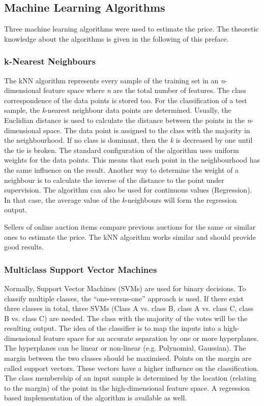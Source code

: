 \subsection{Machine Learning Algorithms}
Three machine learning algorithms were used to estimate the price. The theoretic knowledge about the algorithms is given in the following of this preface.
\subsubsection{k-Nearest Neighbours}
The kNN algorithm \cite{knn} represents every sample of the training set in an \textit{n}-dimensional feature space where \textit{n} are the total number of features. The class correspondence of the data points is stored too. For the classification of a test sample, the \textit{k}-nearest neighbour data points are determined. Usually, the Euclidian distance is used to calculate the distance between the points in the \textit{n}-dimensional space. The data point is assigned to the class with the majority in the neighbourhood. If no class is dominant, then the \textit{k} is decreased by one until the tie is broken. The standard configuration of the algorithm uses uniform weights for the data points. This means that each point in the neighbourhood has the same influence on the result. Another way to determine the weight of a neighbour is to calculate the inverse of the distance to the point under supervision. The algorithm can also be used for continuous values (Regression). In that case, the average value of the \textit{k}-neighbours will form the regression output.

Sellers of online auction items compare previous auctions for the same or similar ones to estimate the price. The kNN algorithm works similar and should provide good results. 
\subsubsection{Multiclass Support Vector Machines}
Normally, Support Vector Machines (SVMs)\cite{svc} are used for binary decisions. To classify multiple classes, the ``one-versus-one'' approach is used. If there exist three classes in total, three SVMs (Class A vs. class B, class A vs. class C, class B vs. class C) are needed. The class with the majority of the votes will be the resulting output. The idea of the classifier is to map the inputs into a high-dimensional feature space for an accurate separation by one or more hyperplanes. The hyperplanes can be linear or non-linear (e.g. Polynomial, Gaussian). The margin between the two classes should be maximised. Points on the margin are called support vectors. These vectors have a higher influence on the classification. The class membership of an input sample is determined by the location (relating to the margin) of the point in the high-dimensional feature space. A regression based implementation of the algorithm is available as well\cite{svr}.

